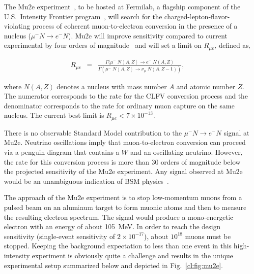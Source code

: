

\label{cl:sec:mu2e}

The Mu2e experiment~\cite{Abrams:2012er}, to be hosted at Fermilab, a flagship component
of the U.S.\ Intensity Frontier program~\cite{IF_review}, will
search for the charged-lepton-flavor-violating process of coherent
muon-to-electron conversion in the presence of a nucleus ($\mu^-N
\rightarrow e^-N$).  Mu2e will improve sensitivity
compared to current experimental by four orders of
magnitude~\cite{Mu2eCDR} and will set a limit on $R_{\mu e}$, defined
as,

%
\begin{eqnarray}
  R_{\mu e} &=& \frac
  {\Gamma(\mu^{-}\;  N(A,Z) \to e^{-}\; N(A,Z)}  {\Gamma(\mu^{-}\; N(A,Z)\to \nu_{\mu}\; N(A,Z-1))},\end{eqnarray}
%

where $N(A,Z)$ denotes a nucleus with mass number $A$ and atomic
number $Z$.  The numerator corresponds to the rate for the CLFV
conversion process and the denominator corresponds to the rate for
ordinary muon capture on the same nucleus.  The current best limit is
$R_{\mu{}e}<7\times10^{-13}$\cite{Bertl:2006up}.

There is no observable Standard Model contribution to the $\mu^-N
\rightarrow e^-N$ signal at Mu2e.  Neutrino oscillations imply that
muon-to-electron conversion can proceed via a penguin diagram that
contains a $W$ and an oscillating neutrino. However, the rate for this
conversion process is more than 30 orders of magnitude below the
projected sensitivity of the Mu2e experiment.  Any signal observed at
Mu2e would be an unambiguous indication of BSM
physics~\cite{Marciano:2008zz,deGouvea:2013zba}.

The approach of the Mu2e experiment is to stop low-momentum muons from
a pulsed beam on an aluminum target to form muonic atoms and then to
measure the resulting electron spectrum.  The signal would produce a
mono-energetic electron with an energy of about 105~MeV.  In order to
reach the design sensitivity (single-event sensitivity of $2\times
10^{-17}$), about $10^{18}$ muons must be stopped.  Keeping the
background expectation to less than one event in this high-intensity
experiment is obviously quite a challenge and results in the unique
experimental setup summarized below and depicted in
Fig.~\ref{cl:fig:mu2e}.

